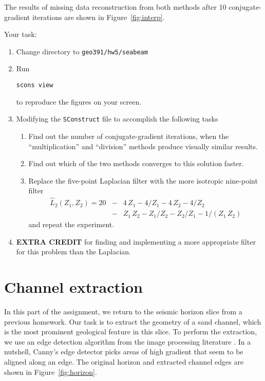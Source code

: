 The results of missing data reconstruction from both methods after 10 conjugate-gradient iterations are shown in Figure~\ref{fig:interp}.


\newpage
Your task:
\begin{enumerate}
\item Change directory to \verb#geo391/hw5/seabeam#
\item Run 
\begin{verbatim}
scons view
\end{verbatim}
to reproduce the figures on your screen.
\item Modifying the \texttt{SConstruct} file to accomplish the following tasks
\begin{enumerate}
\item Find out the number of conjugate-gradient iterations, when the ``multiplication'' and ``division'' methods produce visually similar results.
\item Find out which of the two methods converges to this solution faster.
\item Replace the five-point Laplacian filter with the more isotropic nine-point filter 
\begin{eqnarray}
\nonumber
\hat{L}_2(Z_1,Z_2) = 20 & - & 4\,Z_1 - 4/Z_1 - 4\,Z_2 - 4/Z_2 \\
& - & Z_1\,Z_2 - Z_1/Z_2 - Z_2/Z_1 - 1/(Z_1\,Z_2)
\label{eq:lap9}
\end{eqnarray}
and repeat the experiment.
\end{enumerate}
\item \textbf{EXTRA CREDIT} for finding and implementing a more appropriate filter for this problem than the Laplacian.
\end{enumerate}

\lstset{language=python,numbers=left,numberstyle=\tiny,showstringspaces=false}


\section{Channel extraction}

In this part of the assignment, we return to the seismic horizon slice
from a previous homework. Our task is to extract the geometry of a
sand channel, which is the most prominent geological feature in this
slice. To perform the extraction, we use an edge detection algorithm
from the image processing literature \cite[]{canny}. In a nutshell,
Canny's edge detector picks areas of high gradient that seem to be
aligned along an edge. The original horizon and extracted channel
edges are shown in Figure~\ref{fig:horizon}.

